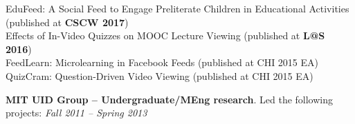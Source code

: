 \documentclass[margin,line]{resume}
\begin{document}
\begin{resume}
EduFeed: A Social Feed to Engage Preliterate Children in Educational Activities (published at \textbf{CSCW 2017})\\
Effects of In-Video Quizzes on MOOC Lecture Viewing (published at \textbf{L@S 2016})\\
FeedLearn: Microlearning in Facebook Feeds (published at CHI 2015 EA)\\
QuizCram: Question-Driven Video Viewing (published at CHI 2015 EA) %

%

\textbf{MIT UID Group -- Undergraduate/MEng research}. Led the following projects: \hfill \textsl{Fall 2011 -- Spring 2013}

\vspace{-2mm}


\end{resume}
\end{document}
